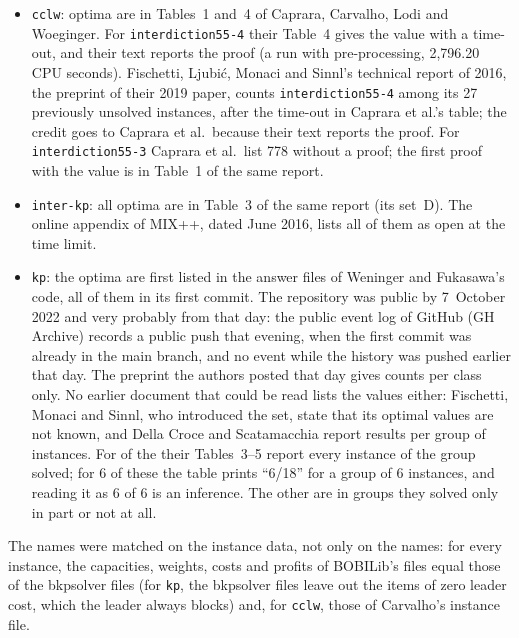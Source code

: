 \begin{itemize}
\item \texttt{cclw}: \NumLitCaprara{} optima are in Tables~1 and~4 of Caprara,
Carvalho, Lodi and Woeginger.\cite{caprara2016bilevel} For
\texttt{interdiction55-4} their Table~4 gives the value with a time-out, and
their text reports the proof (a run with pre-processing, 2,796.20 CPU
seconds). Fischetti, Ljubi\'c, Monaci and Sinnl's technical report of
2016,\cite{fischetti2016monotonicity} the preprint of their 2019
paper,\cite{fischetti2019interdiction} counts \texttt{interdiction55-4} among
its 27 previously unsolved instances, after the time-out in Caprara et al.'s
table; the credit goes to Caprara et al.\ because their text reports the proof.
For \texttt{interdiction55-3} Caprara et al.\ list 778 without a proof; the
first proof with the value is in Table~1 of the same report.
\item \texttt{inter-kp}: all \NumLitFischettiSixteenInterKp{} optima are in
Table~3 of the same report (its set~D). The online appendix of MIX++, dated
June 2016, lists all of them as open at the time limit.\cite{fischetti2016appendix}
\item \texttt{kp}: the \NumLitWeningerFukasawa{} optima are first listed in the
answer files of Weninger and Fukasawa's code, all of them in its first
commit.\cite{weninger_bkpsolver} The repository was public by 7~October 2022
and very probably from that day: the public event log of GitHub (GH Archive)
records a public push that evening, when the first commit was already in the
main branch, and no event while the history was pushed earlier that day. The
preprint the authors posted that day gives counts per class
only.\cite{weninger2022fast} No earlier document that could be read lists the
values either: Fischetti, Monaci and Sinnl, who introduced the set, state that
its optimal values are not known,\cite{fischetti2018dynamic} and Della Croce and
Scatamacchia report results per group of instances.\cite{dellacroce2020exact} For
\NumLitKipProvedEarlier{} of the \NumLitWeningerFukasawa{} their Tables~3--5
report every instance of the group solved; for 6 of these the table prints
``6/18'' for a group of 6 instances, and reading it as 6 of 6 is an inference.
The other \NumLitKipNotProvedEarlier{} are in groups they solved only in part
or not at all.
\end{itemize}
The names were matched on the instance data, not only on the names: for every
instance, the capacities, weights, costs and profits of BOBILib's files equal
those of the bkpsolver files (for \texttt{kp}, the bkpsolver files leave out
the items of zero leader cost, which the leader always blocks) and, for
\texttt{cclw}, those of Carvalho's instance file.

